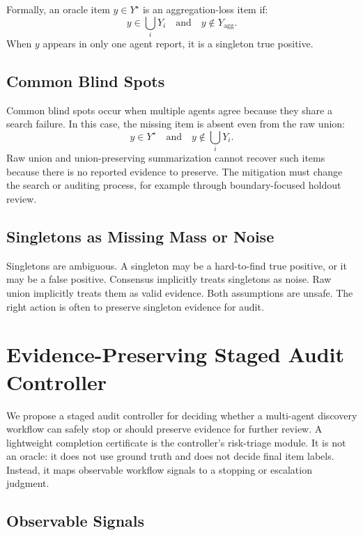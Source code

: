 \documentclass[letterpaper]{article}
\begin{document}
Formally, an oracle item $y \in Y^\star$ is an aggregation-loss item if:
\begin{equation}
y \in \bigcup_i Y_i \quad \text{and} \quad y \notin Y_{\text{agg}}.
\end{equation}
When $y$ appears in only one agent report, it is a singleton true positive.

\subsection{Common Blind Spots}

Common blind spots occur when multiple agents agree because they share a search
failure. In this case, the missing item is absent even from the raw union:
\begin{equation}
y \in Y^\star \quad \text{and} \quad y \notin \bigcup_i Y_i.
\end{equation}
Raw union and union-preserving summarization cannot recover such items because
there is no reported evidence to preserve. The mitigation must change the search
or auditing process, for example through boundary-focused holdout review.

\subsection{Singletons as Missing Mass or Noise}

Singletons are ambiguous. A singleton may be a hard-to-find true positive, or it
may be a false positive. Consensus implicitly treats singletons as noise. Raw
union implicitly treats them as valid evidence. Both assumptions are unsafe. The
right action is often to preserve singleton evidence for audit.

\section{Evidence-Preserving Staged Audit Controller}

We propose a staged audit controller for deciding whether a multi-agent
discovery workflow can safely stop or should preserve evidence for further
review. A lightweight completion certificate is the controller's risk-triage
module. It is not an oracle: it does not use ground truth and does not decide
final item labels. Instead, it maps observable workflow signals to a stopping
or escalation judgment.

\subsection{Observable Signals}
\end{document}
